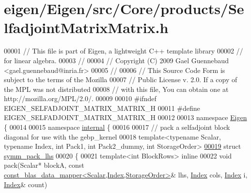 \hypertarget{eigen_2_eigen_2src_2_core_2products_2_selfadjoint_matrix_matrix_8h_source}{}\section{eigen/\+Eigen/src/\+Core/products/\+Selfadjoint\+Matrix\+Matrix.h}
\label{eigen_2_eigen_2src_2_core_2products_2_selfadjoint_matrix_matrix_8h_source}

\begin{DoxyCode}
00001 \textcolor{comment}{// This file is part of Eigen, a lightweight C++ template library}
00002 \textcolor{comment}{// for linear algebra.}
00003 \textcolor{comment}{//}
00004 \textcolor{comment}{// Copyright (C) 2009 Gael Guennebaud <gael.guennebaud@inria.fr>}
00005 \textcolor{comment}{//}
00006 \textcolor{comment}{// This Source Code Form is subject to the terms of the Mozilla}
00007 \textcolor{comment}{// Public License v. 2.0. If a copy of the MPL was not distributed}
00008 \textcolor{comment}{// with this file, You can obtain one at http://mozilla.org/MPL/2.0/.}
00009 
00010 \textcolor{preprocessor}{#ifndef EIGEN\_SELFADJOINT\_MATRIX\_MATRIX\_H}
00011 \textcolor{preprocessor}{#define EIGEN\_SELFADJOINT\_MATRIX\_MATRIX\_H}
00012 
00013 \textcolor{keyword}{namespace }\hyperlink{namespace_eigen}{Eigen} \{ 
00014 
00015 \textcolor{keyword}{namespace }\hyperlink{namespaceinternal}{internal} \{
00016 
00017 \textcolor{comment}{// pack a selfadjoint block diagonal for use with the gebp\_kernel}
00018 \textcolor{keyword}{template}<\textcolor{keyword}{typename} Scalar, \textcolor{keyword}{typename} Index, \textcolor{keywordtype}{int} Pack1, \textcolor{keywordtype}{int} Pack2\_dummy, \textcolor{keywordtype}{int} StorageOrder>
\hyperlink{struct_eigen_1_1internal_1_1symm__pack__lhs}{00019} \textcolor{keyword}{struct }\hyperlink{struct_eigen_1_1internal_1_1symm__pack__lhs}{symm\_pack\_lhs}
00020 \{
00021   \textcolor{keyword}{template}<\textcolor{keywordtype}{int} BlockRows> \textcolor{keyword}{inline}
00022   \textcolor{keywordtype}{void} pack(Scalar* blockA, \textcolor{keyword}{const} 
      \hyperlink{class_eigen_1_1internal_1_1const__blas__data__mapper}{const\_blas\_data\_mapper<Scalar,Index,StorageOrder>}& lhs, 
      \hyperlink{namespace_eigen_a62e77e0933482dafde8fe197d9a2cfde}{Index} cols, \hyperlink{namespace_eigen_a62e77e0933482dafde8fe197d9a2cfde}{Index} i, \hyperlink{namespace_eigen_a62e77e0933482dafde8fe197d9a2cfde}{Index}& count)

\end{DoxyCode}
